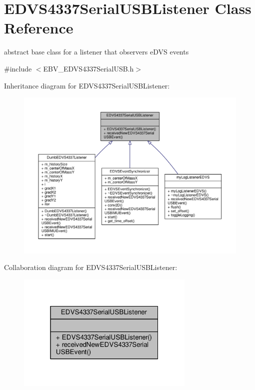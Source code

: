 \hypertarget{class_e_d_v_s4337_serial_u_s_b_listener}{}\section{E\+D\+V\+S4337\+Serial\+U\+S\+B\+Listener Class Reference}
\label{class_e_d_v_s4337_serial_u_s_b_listener}


abstract base class for a listener that observers e\+D\+V\+S events  




{\ttfamily \#include $<$E\+B\+V\+\_\+\+E\+D\+V\+S4337\+Serial\+U\+S\+B.\+h$>$}



Inheritance diagram for E\+D\+V\+S4337\+Serial\+U\+S\+B\+Listener\+:
\nopagebreak
\begin{figure}[H]
\begin{center}
\leavevmode
\includegraphics[width=350pt]{class_e_d_v_s4337_serial_u_s_b_listener__inherit__graph}
\end{center}
\end{figure}


Collaboration diagram for E\+D\+V\+S4337\+Serial\+U\+S\+B\+Listener\+:
\nopagebreak
\begin{figure}[H]
\begin{center}
\leavevmode
\includegraphics[width=241pt]{class_e_d_v_s4337_serial_u_s_b_listener__coll__graph}
\end{center}
\end{figure}
